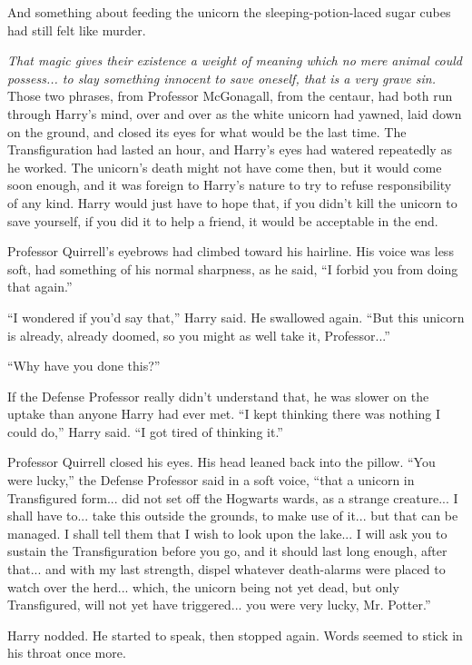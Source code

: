 And something about feeding the unicorn the sleeping-potion-laced sugar cubes had still felt like murder.

\emph{That magic gives their existence a weight of meaning which no mere animal could possess... to slay something innocent to save oneself, that is a very grave sin.} Those two phrases, from Professor McGonagall, from the centaur, had both run through Harry's mind, over and over as the white unicorn had yawned, laid down on the ground, and closed its eyes for what would be the last time. The Transfiguration had lasted an hour, and Harry's eyes had watered repeatedly as he worked. The unicorn's death might not have come then, but it would come soon enough, and it was foreign to Harry's nature to try to refuse responsibility of any kind. Harry would just have to hope that, if you didn't kill the unicorn to save yourself, if you did it to help a friend, it would be acceptable in the end.

Professor Quirrell's eyebrows had climbed toward his hairline. His voice was less soft, had something of his normal sharpness, as he said, ``I forbid you from doing that again.''

``I wondered if you'd say that,'' Harry said. He swallowed again. ``But this unicorn is already, already doomed, so you might as well take it, Professor...''

``Why have you done this?''

If the Defense Professor really didn't understand that, he was slower on the uptake than anyone Harry had ever met. ``I kept thinking there was nothing I could do,'' Harry said. ``I got tired of thinking it.''

Professor Quirrell closed his eyes. His head leaned back into the pillow. ``You were lucky,'' the Defense Professor said in a soft voice, ``that a unicorn in Transfigured form... did not set off the Hogwarts wards, as a strange creature... I shall have to... take this outside the grounds, to make use of it... but that can be managed. I shall tell them that I wish to look upon the lake... I will ask you to sustain the Transfiguration before you go, and it should last long enough, after that... and with my last strength, dispel whatever death-alarms were placed to watch over the herd... which, the unicorn being not yet dead, but only Transfigured, will not yet have triggered... you were very lucky, Mr. Potter.''

Harry nodded. He started to speak, then stopped again. Words seemed to stick in his throat once more.

